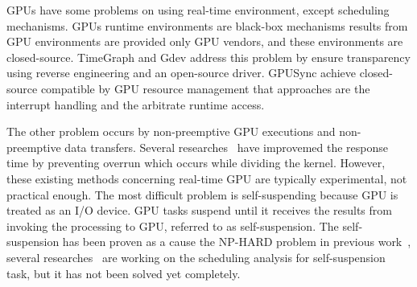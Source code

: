 GPUs have some problems on using real-time environment, except  scheduling mechanisms.
GPUs runtime environments are black-box mechanisms results from GPU environments are provided only GPU vendors, and these environments are closed-source.
TimeGraph and Gdev address this problem by ensure transparency using reverse engineering and an open-source driver.
GPUSync achieve closed-source compatible by GPU resource management that approaches are the interrupt handling and the arbitrate runtime access.

The other problem occurs by non-preemptive GPU executions and non-preemptive data transfers.
Several researches~\cite{basaran:preemptive,sparc} have improvemed the response time by preventing overrun which occurs while dividing the kernel.
However, these existing methods concerning real-time GPU are typically experimental, not practical enough.
The most difficult problem is self-suspending because GPU is treated as an I/O device.
GPU tasks suspend until it receives the results from invoking the processing to GPU, referred to as self-suspension.
The self-suspension has been proven as a cause the NP-HARD problem in previous work~\cite{self-sus:1,self-sus:2},
several researches~\cite{chattopadhyay2014limited,kim2013segment} are working on the scheduling analysis for self-suspension task, but it has not been solved yet completely.


